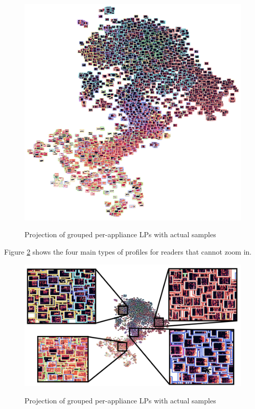 \begin{figure}[H]
	\centering
	\caption{Projection of grouped per-appliance LPs with actual samples}
	\includegraphics[width=.9\textwidth]{Figures/TSNE/TSNE_results/all/img_scatter_all_all_groups.png}
	\label{fig:tsne_papb_img_scatter_all_groups}
\end{figure}

Figure \ref{fig:t-sne_zoomed} shows the four main types of profiles for readers that cannot zoom in.

\begin{figure}[H]
	\centering
	\caption{Projection of grouped per-appliance LPs with actual samples}
	\includegraphics[width=.9\textwidth]{Figures/TSNE/TSNE_results/all/t-sne_zoomed.png}
	\label{fig:t-sne_zoomed}
\end{figure}

